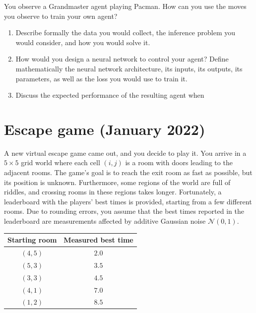 \documentclass[11pt, a4paper]{article}
\begin{document}
You observe a Grandmaster agent playing Pacman. How can you use the moves you observe to train your own agent?

\begin{enumerate}
    \item Describe formally the data you would collect, the inference problem you would consider, and how you would solve it.

    \item How would you design a neural network to control your agent? Define mathematically the neural network architecture, its inputs, its outputs, its parameters, as well as the loss you would use to train it.

    \item Discuss the expected performance of the resulting agent when 
\end{enumerate}

\newpage

\section{Escape game (January 2022)}

A new virtual escape game came out, and you decide to play it. You arrive in a $5 \times 5$ grid world where each cell $(i, j)$ is a room with doors leading to the adjacent rooms. The game's goal is to reach the exit room as fast as possible, but its position is unknown. Furthermore, some regions of the world are full of riddles, and crossing rooms in these regions takes longer. Fortunately, a leaderboard with the players' best times is provided, starting from a few different rooms. Due to rounding errors, you assume that the best times reported in the leaderboard are measurements affected by additive Gaussian noise $\mathcal{N}(0, 1)$.

\begin{table}[h]
    \centering
    \begin{tabular}{cc}
        \toprule
        Starting room & Measured best time \\
        \midrule
        $(4, 5)$ & $2.0$ \\
        $(5, 3)$ & $3.5$ \\
        $(3, 3)$ & $4.5$ \\
        $(4, 1)$ & $7.0$ \\
        $(1, 2)$ & $8.5$ \\
        \bottomrule
    \end{tabular}
\end{table}
\end{document}
